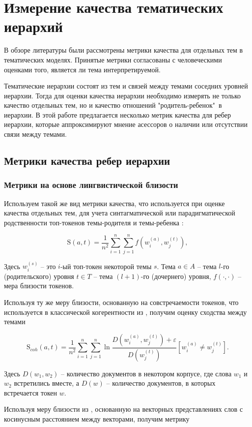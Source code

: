 \chapter{Измерение качества тематических иерархий}
В обзоре литературы были рассмотрены метрики качества для отдельных тем в тематических моделях. Принятые метрики согласованы с человеческими оценками того, является ли тема интерпретируемой.

Тематические иерархии состоят из тем и связей между темами соседних уровней иерархии. Тогда для оценки качества иерархии необходимо измерять не только качество отдельных тем, но и качество отношений "родитель-ребенок"\ в иерархии. В этой работе предлагается несколько метрик качества для ребер иерархии, которые аппроксимируют мнение асессоров о наличии или отсутствии связи между темами.  

\section{Метрики качества ребер иерархии}
\subsection{Метрики на основе лингвистической близости}
 Используем такой же вид метрики качества, что используется при оценке качества отдельных тем, для учета синтагматической или парадигматической родственности топ-токенов темы-родителя и темы-ребенка \cite{Schutze1993}:

$$\mathrm{S}(a, t) = \dfrac{1}{n^2}\sum\limits_{i=1}^{n}\sum\limits_{j=1}^n f(w_i^{(a)}, w_j^{(t)}),$$

Здесь $w_i^{(s)}$ -- это $i$-ый топ-токен некоторой темы $s$. Тема $a \in A$ -- тема $l$-го (родительского) уровня $t\in T$ -- тема $(l+1)$-го (дочернего) уровня, $f(\cdot, \cdot)$ -- мера близости токенов.

Используя ту же меру близости, основанную на совстречаемости токенов, что используется в классической когерентности из \cite{Mimno2011}, получим оценку сходства между темами 

$$\mathrm{S}_{coh}(a, t) = \dfrac{1}{n^2}\sum\limits_{i=1}^n \sum\limits_{j=1}^n \ln \dfrac{D(w^{(a)}_i, w^{(t)}_j) + \varepsilon}{D(w^{(t)}_j)}[w_i^{(a)} \neq w_j^{(t)}].$$ 

Здесь $D(w_1, w_2)$ -- количество документов в некотором корпусе, где слова $w_1$ и $w_2$ встретились вместе, а $D(w)$ -- количество документов, в которых встречается токен $w$.

Используя меру близости из \cite{Nikolenko2016}, основанную на векторных представлениях слов с косинусным расстоянием между векторами, получим метрику 

